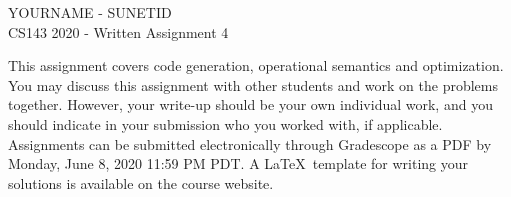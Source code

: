 \documentclass[11pt]{article}
\begin{document}
\begin{center}
\LARGE YOURNAME - SUNETID \\
\Large CS143 2020 - Written Assignment 4
\end{center}


This assignment covers code generation, operational semantics and optimization. You may discuss this assignment with other students and work on the problems together. However, your write-up should be your own individual work, and you should indicate in your submission who you worked with, if applicable. Assignments can be submitted electronically through Gradescope as a PDF by Monday, June 8, 2020 11:59 PM PDT. A \LaTeX \ template for writing your solutions is available on the course website.
\end{document}

